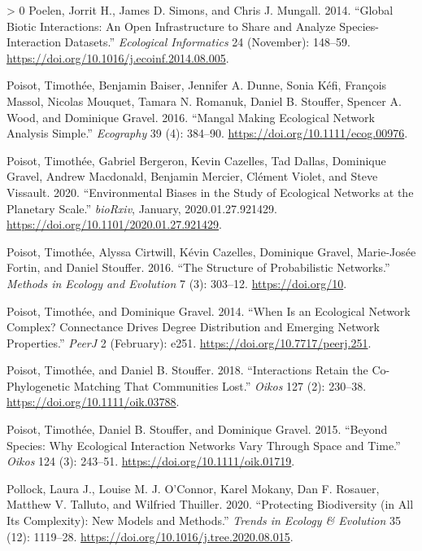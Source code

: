 \documentclass[10pt,oneside]{article}
\newlength{\cslhangindent}
\newenvironment{CSLReferences}[3] %
 {%
  \setlength{\parindent}{0pt}
  \ifodd #1 \everypar{\setlength{\hangindent}{\cslhangindent}}\ignorespaces\fi
  \ifnum #2 > 0
  \setlength{\parskip}{#2\baselineskip}
  \fi
 }%
 {}
\begin{document}
\begin{CSLReferences}{1}{0}
\leavevmode\hypertarget{ref-Poelen2014GloBio}{}%
Poelen, Jorrit H., James D. Simons, and Chris J. Mungall. 2014.
{``Global Biotic Interactions: An Open Infrastructure to Share and
Analyze Species-Interaction Datasets.''} \emph{Ecological Informatics}
24 (November): 148--59.
\url{https://doi.org/10.1016/j.ecoinf.2014.08.005}.

\leavevmode\hypertarget{ref-Poisot2016ManMak}{}%
Poisot, Timothée, Benjamin Baiser, Jennifer A. Dunne, Sonia Kéfi,
François Massol, Nicolas Mouquet, Tamara N. Romanuk, Daniel B. Stouffer,
Spencer A. Wood, and Dominique Gravel. 2016. {``Mangal Making Ecological
Network Analysis Simple.''} \emph{Ecography} 39 (4): 384--90.
\url{https://doi.org/10.1111/ecog.00976}.

\leavevmode\hypertarget{ref-Poisot2020EnvBia}{}%
Poisot, Timothée, Gabriel Bergeron, Kevin Cazelles, Tad Dallas,
Dominique Gravel, Andrew Macdonald, Benjamin Mercier, Clément Violet,
and Steve Vissault. 2020. {``Environmental Biases in the Study of
Ecological Networks at the Planetary Scale.''} \emph{bioRxiv}, January,
2020.01.27.921429. \url{https://doi.org/10.1101/2020.01.27.921429}.

\leavevmode\hypertarget{ref-Poisot2016StrPro}{}%
Poisot, Timothée, Alyssa Cirtwill, Kévin Cazelles, Dominique Gravel,
Marie-Josée Fortin, and Daniel Stouffer. 2016. {``The Structure of
Probabilistic Networks.''} \emph{Methods in Ecology and Evolution} 7
(3): 303--12. \url{https://doi.org/10}.

\leavevmode\hypertarget{ref-Poisot2014WheEco}{}%
Poisot, Timothée, and Dominique Gravel. 2014. {``When Is an Ecological
Network Complex? Connectance Drives Degree Distribution and Emerging
Network Properties.''} \emph{PeerJ} 2 (February): e251.
\url{https://doi.org/10.7717/peerj.251}.

\leavevmode\hypertarget{ref-Poisot2018IntRet}{}%
Poisot, Timothée, and Daniel B. Stouffer. 2018. {``Interactions Retain
the Co-Phylogenetic Matching That Communities Lost.''} \emph{Oikos} 127
(2): 230--38. \url{https://doi.org/10.1111/oik.03788}.

\leavevmode\hypertarget{ref-Poisot2015SpeWhy}{}%
Poisot, Timothée, Daniel B. Stouffer, and Dominique Gravel. 2015.
{``Beyond Species: Why Ecological Interaction Networks Vary Through
Space and Time.''} \emph{Oikos} 124 (3): 243--51.
\url{https://doi.org/10.1111/oik.01719}.

\leavevmode\hypertarget{ref-Pollock2020ProBio}{}%
Pollock, Laura J., Louise M. J. O'Connor, Karel Mokany, Dan F. Rosauer,
Matthew V. Talluto, and Wilfried Thuiller. 2020. {``Protecting
Biodiversity (in All Its Complexity): New Models and Methods.''}
\emph{Trends in Ecology \& Evolution} 35 (12): 1119--28.
\url{https://doi.org/10.1016/j.tree.2020.08.015}.


\end{CSLReferences}
\end{document}
